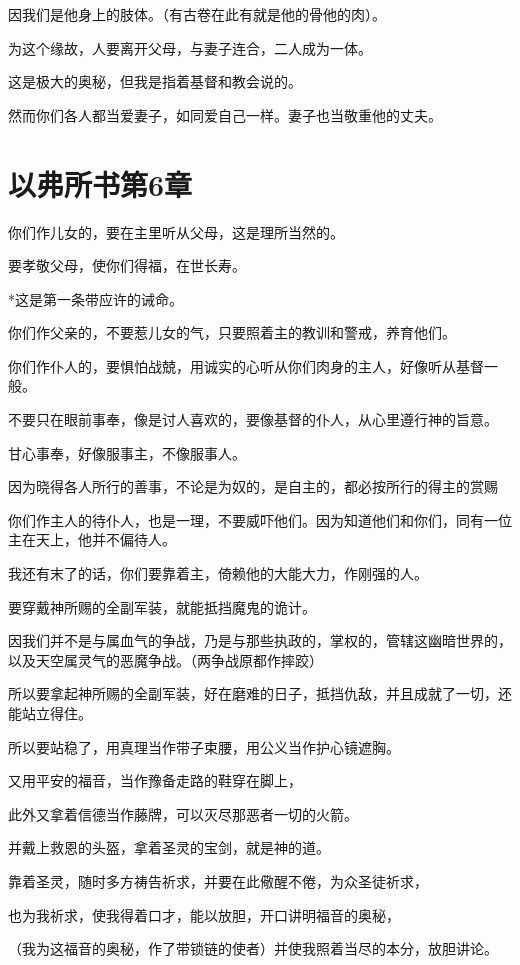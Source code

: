 \documentclass[12pt,oneside]{book}
\begin{document}
因我们是他身上的肢体。（有古卷在此有就是他的骨他的肉）。

为这个缘故，人要离开父母，与妻子连合，二人成为一体。

这是极大的奥秘，但我是指着基督和教会说的。

然而你们各人都当爱妻子，如同爱自己一样。妻子也当敬重他的丈夫。

\chapter{以弗所书第6章}
你们作儿女的，要在主里听从父母，这是理所当然的。

要孝敬父母，使你们得福，在世长寿。

*这是第一条带应许的诫命。

你们作父亲的，不要惹儿女的气，只要照着主的教训和警戒，养育他们。

你们作仆人的，要惧怕战兢，用诚实的心听从你们肉身的主人，好像听从基督一般。

不要只在眼前事奉，像是讨人喜欢的，要像基督的仆人，从心里遵行神的旨意。

甘心事奉，好像服事主，不像服事人。

因为晓得各人所行的善事，不论是为奴的，是自主的，都必按所行的得主的赏赐

你们作主人的待仆人，也是一理，不要威吓他们。因为知道他们和你们，同有一位主在天上，他并不偏待人。

我还有末了的话，你们要靠着主，倚赖他的大能大力，作刚强的人。

要穿戴神所赐的全副军装，就能抵挡魔鬼的诡计。

因我们并不是与属血气的争战，乃是与那些执政的，掌权的，管辖这幽暗世界的，以及天空属灵气的恶魔争战。（两争战原都作摔跤）

所以要拿起神所赐的全副军装，好在磨难的日子，抵挡仇敌，并且成就了一切，还能站立得住。

所以要站稳了，用真理当作带子束腰，用公义当作护心镜遮胸。

又用平安的福音，当作豫备走路的鞋穿在脚上，

此外又拿着信德当作藤牌，可以灭尽那恶者一切的火箭。

并戴上救恩的头盔，拿着圣灵的宝剑，就是神的道。

靠着圣灵，随时多方祷告祈求，并要在此儆醒不倦，为众圣徒祈求，

也为我祈求，使我得着口才，能以放胆，开口讲明福音的奥秘，

（我为这福音的奥秘，作了带锁链的使者）并使我照着当尽的本分，放胆讲论。
\end{document}
